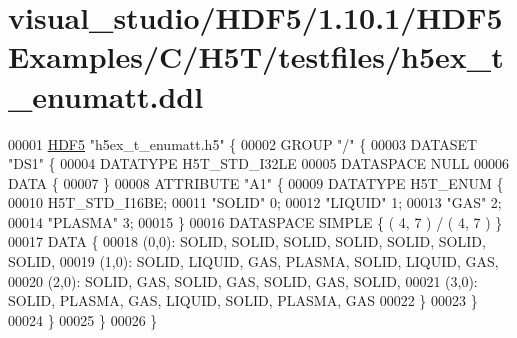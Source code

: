\hypertarget{visual__studio_2_h_d_f5_21_810_81_2_h_d_f5_examples_2_c_2_h5_t_2testfiles_2h5ex__t__enumatt_8ddl_source}{}\section{visual\+\_\+studio/\+H\+D\+F5/1.10.1/\+H\+D\+F5\+Examples/\+C/\+H5\+T/testfiles/h5ex\+\_\+t\+\_\+enumatt.ddl}
\label{visual__studio_2_h_d_f5_21_810_81_2_h_d_f5_examples_2_c_2_h5_t_2testfiles_2h5ex__t__enumatt_8ddl_source}

\begin{DoxyCode}
00001 \hyperlink{namespace_h_d_f5}{HDF5} \textcolor{stringliteral}{"h5ex\_t\_enumatt.h5"} \{
00002 GROUP \textcolor{stringliteral}{"/"} \{
00003    DATASET \textcolor{stringliteral}{"DS1"} \{
00004       DATATYPE  H5T\_STD\_I32LE
00005       DATASPACE  NULL
00006       DATA \{
00007       \}
00008       ATTRIBUTE \textcolor{stringliteral}{"A1"} \{
00009          DATATYPE  H5T\_ENUM \{
00010             H5T\_STD\_I16BE;
00011             \textcolor{stringliteral}{"SOLID"}            0;
00012             \textcolor{stringliteral}{"LIQUID"}           1;
00013             \textcolor{stringliteral}{"GAS"}              2;
00014             \textcolor{stringliteral}{"PLASMA"}           3;
00015          \}
00016          DATASPACE  SIMPLE \{ ( 4, 7 ) / ( 4, 7 ) \}
00017          DATA \{
00018          (0,0): SOLID, SOLID, SOLID, SOLID, SOLID, SOLID, SOLID,
00019          (1,0): SOLID, LIQUID, GAS, PLASMA, SOLID, LIQUID, GAS,
00020          (2,0): SOLID, GAS, SOLID, GAS, SOLID, GAS, SOLID,
00021          (3,0): SOLID, PLASMA, GAS, LIQUID, SOLID, PLASMA, GAS
00022          \}
00023       \}
00024    \}
00025 \}
00026 \}
\end{DoxyCode}
